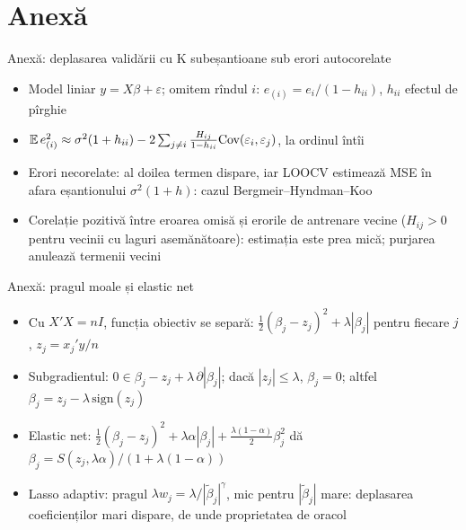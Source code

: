 \section{Anexă}

\begin{frame}{Anexă: deplasarea validării cu K subeșantioane sub erori autocorelate}
\hypertarget{atsapp1}{}
\itemsize{\small}
\begin{itemize}
    \item Model liniar $y = X\beta + \varepsilon$; omitem rîndul $i$: $e_{(i)} = e_i/(1 - h_{ii})$, $h_{ii}$ efectul de pîrghie
    \item $\mathbb{E}\,e_{(i)}^2 \approx \sigma^2(1 + h_{ii}) - 2\sum_{j\ne i}\frac{H_{ij}}{1 - h_{ii}}\text{Cov}(\varepsilon_i, \varepsilon_j)$, la ordinul întîi
    \item Erori necorelate: al doilea termen dispare, iar LOOCV estimează MSE în afara eșantionului $\sigma^2(1 + h)$: cazul Bergmeir--Hyndman--Koo
    \item Corelație pozitivă între eroarea omisă și erorile de antrenare vecine ($H_{ij} > 0$ pentru vecinii cu laguri asemănătoare): estimația este prea mică; purjarea anulează termenii vecini
\end{itemize}
\end{frame}

\begin{frame}{Anexă: pragul moale și elastic net}
\hypertarget{atsapp2}{}
\itemsize{\small}
\begin{itemize}
    \item Cu $X'X = nI$, funcția obiectiv se separă: $\frac12(\beta_j - z_j)^2 + \lambda|\beta_j|$ pentru fiecare $j$, $z_j = x_j'y/n$
    \item Subgradientul: $0 \in \beta_j - z_j + \lambda\,\partial|\beta_j|$; dacă $|z_j| \le \lambda$, $\beta_j = 0$; altfel $\beta_j = z_j - \lambda\,\mathrm{sign}(z_j)$
    \item Elastic net: $\frac12(\beta_j - z_j)^2 + \lambda\alpha|\beta_j| + \frac{\lambda(1 - \alpha)}2\beta_j^2$ dă $\beta_j = S(z_j, \lambda\alpha)/(1 + \lambda(1 - \alpha))$
    \item Lasso adaptiv: pragul $\lambda w_j = \lambda/|\tilde\beta_j|^\gamma$, mic pentru $|\tilde\beta_j|$ mare: deplasarea coeficienților mari dispare, de unde proprietatea de oracol
\end{itemize}
\end{frame}


